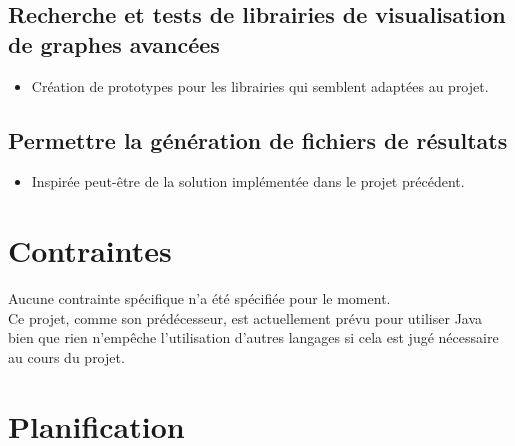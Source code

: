 \documentclass{article}
\begin{document}
  \subsection{Recherche et tests de librairies de visualisation de graphes avancées}
    \begin{itemize}
      \item Création de prototypes pour les librairies qui semblent adaptées au projet.
    \end{itemize}
  \subsection{Permettre la génération de fichiers de résultats}
    \begin{itemize}
      \item Inspirée peut-être de la solution implémentée dans le projet précédent.
    \end{itemize}

\section{Contraintes}
  Aucune contrainte spécifique n'a été spécifiée pour le moment.\\
  Ce projet, comme son prédécesseur, est actuellement prévu pour utiliser Java bien que rien n'empêche l'utilisation d'autres langages si cela est jugé nécessaire au cours du projet.

\section{Planification}
\end{document}
